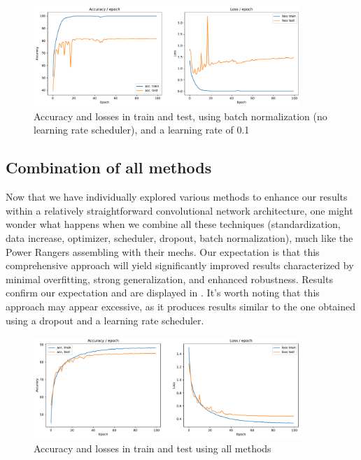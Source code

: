 \begin{figure}[H]
    \centering
    \includegraphics*[width=0.9\textwidth]{figs/CNN/batchnorm_no_scheduler_high_lr.pdf}
    \caption{Accuracy and losses in train and test, using batch normalization (no learning rate scheduler), and a learning rate of 0.1}
    \label{fig:batchnorm_no_scheduler_high_lr}
\end{figure}

\subsection{Combination of all methods}
Now that we have individually explored various methods to enhance our results within a relatively straightforward convolutional network architecture, one might wonder what happens when we combine all these techniques (standardization, data increase, optimizer, scheduler, dropout, batch normalization), much like the Power Rangers assembling with their mechs. Our expectation is that this comprehensive approach will yield significantly improved results characterized by minimal overfitting, strong generalization, and enhanced robustness. Results confirm our expectation and are displayed in . It's worth noting that this approach may appear excessive, as it produces results similar to the one obtained using a dropout and a learning rate scheduler.

\begin{figure}[H]
    \centering
    \includegraphics*[width=0.9\textwidth]{figs/CNN/combined.pdf}
    \caption{Accuracy and losses in train and test using all methods}
    \label{fig:combined}
\end{figure}

